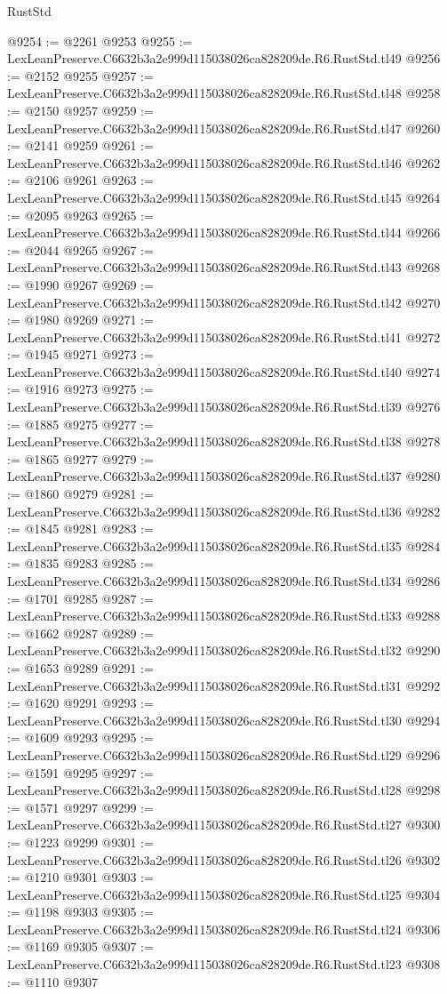 \begin{lexlean}{RustStd}
\begin{coremodule}
@9254 := @2261 @9253
@9255 := LexLeanPreserve.C6632b3a2e999d115038026ca828209de.R6.RustStd.tl49
@9256 := @2152 @9255
@9257 := LexLeanPreserve.C6632b3a2e999d115038026ca828209de.R6.RustStd.tl48
@9258 := @2150 @9257
@9259 := LexLeanPreserve.C6632b3a2e999d115038026ca828209de.R6.RustStd.tl47
@9260 := @2141 @9259
@9261 := LexLeanPreserve.C6632b3a2e999d115038026ca828209de.R6.RustStd.tl46
@9262 := @2106 @9261
@9263 := LexLeanPreserve.C6632b3a2e999d115038026ca828209de.R6.RustStd.tl45
@9264 := @2095 @9263
@9265 := LexLeanPreserve.C6632b3a2e999d115038026ca828209de.R6.RustStd.tl44
@9266 := @2044 @9265
@9267 := LexLeanPreserve.C6632b3a2e999d115038026ca828209de.R6.RustStd.tl43
@9268 := @1990 @9267
@9269 := LexLeanPreserve.C6632b3a2e999d115038026ca828209de.R6.RustStd.tl42
@9270 := @1980 @9269
@9271 := LexLeanPreserve.C6632b3a2e999d115038026ca828209de.R6.RustStd.tl41
@9272 := @1945 @9271
@9273 := LexLeanPreserve.C6632b3a2e999d115038026ca828209de.R6.RustStd.tl40
@9274 := @1916 @9273
@9275 := LexLeanPreserve.C6632b3a2e999d115038026ca828209de.R6.RustStd.tl39
@9276 := @1885 @9275
@9277 := LexLeanPreserve.C6632b3a2e999d115038026ca828209de.R6.RustStd.tl38
@9278 := @1865 @9277
@9279 := LexLeanPreserve.C6632b3a2e999d115038026ca828209de.R6.RustStd.tl37
@9280 := @1860 @9279
@9281 := LexLeanPreserve.C6632b3a2e999d115038026ca828209de.R6.RustStd.tl36
@9282 := @1845 @9281
@9283 := LexLeanPreserve.C6632b3a2e999d115038026ca828209de.R6.RustStd.tl35
@9284 := @1835 @9283
@9285 := LexLeanPreserve.C6632b3a2e999d115038026ca828209de.R6.RustStd.tl34
@9286 := @1701 @9285
@9287 := LexLeanPreserve.C6632b3a2e999d115038026ca828209de.R6.RustStd.tl33
@9288 := @1662 @9287
@9289 := LexLeanPreserve.C6632b3a2e999d115038026ca828209de.R6.RustStd.tl32
@9290 := @1653 @9289
@9291 := LexLeanPreserve.C6632b3a2e999d115038026ca828209de.R6.RustStd.tl31
@9292 := @1620 @9291
@9293 := LexLeanPreserve.C6632b3a2e999d115038026ca828209de.R6.RustStd.tl30
@9294 := @1609 @9293
@9295 := LexLeanPreserve.C6632b3a2e999d115038026ca828209de.R6.RustStd.tl29
@9296 := @1591 @9295
@9297 := LexLeanPreserve.C6632b3a2e999d115038026ca828209de.R6.RustStd.tl28
@9298 := @1571 @9297
@9299 := LexLeanPreserve.C6632b3a2e999d115038026ca828209de.R6.RustStd.tl27
@9300 := @1223 @9299
@9301 := LexLeanPreserve.C6632b3a2e999d115038026ca828209de.R6.RustStd.tl26
@9302 := @1210 @9301
@9303 := LexLeanPreserve.C6632b3a2e999d115038026ca828209de.R6.RustStd.tl25
@9304 := @1198 @9303
@9305 := LexLeanPreserve.C6632b3a2e999d115038026ca828209de.R6.RustStd.tl24
@9306 := @1169 @9305
@9307 := LexLeanPreserve.C6632b3a2e999d115038026ca828209de.R6.RustStd.tl23
@9308 := @1110 @9307

\end{coremodule}
\end{lexlean}
